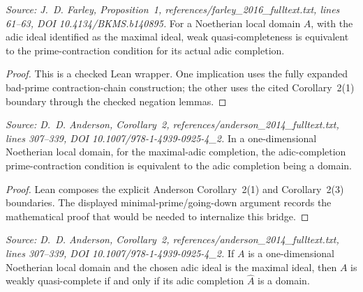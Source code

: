 \begin{lemma}
  \label{lem:weakly_quasi_complete_iff_adic_completion_prime_contraction}
  \textit{Source: J.~D. Farley, Proposition~1,
  references/farley\_2016\_fulltext.txt, lines 61--63,
  DOI 10.4134/BKMS.b140895.}
  For a Noetherian local domain \(A\), with the adic ideal identified as the
  maximal ideal, weak quasi-completeness is equivalent to the
  prime-contraction condition for its actual adic completion.
\end{lemma}

\begin{proof}
  This is a checked Lean wrapper.  One implication uses the fully expanded
  bad-prime contraction-chain construction; the other uses the cited
  Corollary~2(1) boundary through the checked negation lemmas.
\end{proof}

\begin{lemma}
  \label{lem:dimension_one_adic_completion_prime_contraction_iff_analytic_irreducible}
  \textit{Source: D.~D. Anderson, Corollary~2,
  references/anderson\_2014\_fulltext.txt, lines 307--339,
  DOI 10.1007/978-1-4939-0925-4\_2.}
  In a one-dimensional Noetherian local domain, for the maximal-adic
  completion, the adic-completion prime-contraction condition is equivalent to
  the adic completion being a domain.
\end{lemma}

\begin{proof}
  Lean composes the explicit Anderson Corollary~2(1) and Corollary~2(3)
  boundaries.  The displayed minimal-prime/going-down argument records the
  mathematical proof that would be needed to internalize this bridge.
\end{proof}

\begin{lemma}
  \label{lem:dimension_one_weak_criterion_adic_completion_source}
  \textit{Source: D.~D. Anderson, Corollary~2,
  references/anderson\_2014\_fulltext.txt, lines 307--339,
  DOI 10.1007/978-1-4939-0925-4\_2.}
  If \(A\) is a one-dimensional Noetherian local domain and the chosen adic
  ideal is the maximal ideal, then \(A\) is weakly quasi-complete if and only
  if its adic completion \(\widehat A\) is a domain.
\end{lemma}

